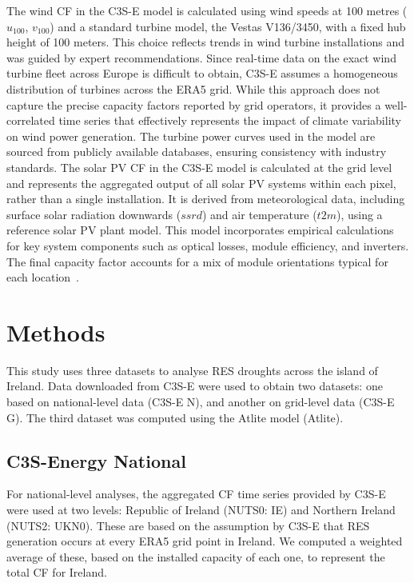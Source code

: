 \documentclass[preprint, 12pt]{elsarticle}
\begin{document}
The wind CF in the C3S-E model is calculated using wind speeds at 100 metres ($u_{100}$, $v_{100}$) and a standard turbine model, the Vestas V136/3450, with a fixed hub height of 100 meters. This choice reflects trends in wind turbine installations and was guided by expert recommendations. Since real-time data on the exact wind turbine fleet across Europe is difficult to obtain, C3S-E assumes a homogeneous distribution of turbines across the ERA5 grid. While this approach does not capture the precise capacity factors reported by grid operators, it provides a well-correlated time series that effectively represents the impact of climate variability on wind power generation. The turbine power curves used in the model are sourced from publicly available databases, ensuring consistency with industry standards. The solar PV CF in the C3S-E model is calculated at the grid level and represents the aggregated output of all solar PV systems within each pixel, rather than a single installation. It is derived from meteorological data, including surface solar radiation downwards ($ssrd$) and air temperature ($t2m$), using a reference solar PV plant model. This model incorporates empirical calculations for key system components such as optical losses, module efficiency, and inverters. The final capacity factor accounts for a mix of module orientations typical for each location~\citep{saintdrenan2018solar}. 

\section{Methods}
\label{sec:methods}

This study uses three datasets to analyse RES droughts across the island of Ireland. Data downloaded from C3S-E were used to obtain two datasets: one based on national-level data (C3S-E N), and another on grid-level data (C3S-E G). The third dataset was computed using the Atlite model (Atlite).

\subsection{C3S-Energy National}
\label{sec:c3se_n}

For national-level analyses, the aggregated CF time series provided by C3S-E were used at two levels: Republic of Ireland (NUTS0: IE) and Northern Ireland (NUTS2: UKN0). These are based on the assumption by C3S-E that RES generation occurs at every ERA5 grid point in Ireland. We computed a weighted average of these, based on the installed capacity of each one, to represent the total CF for Ireland.
\end{document}
